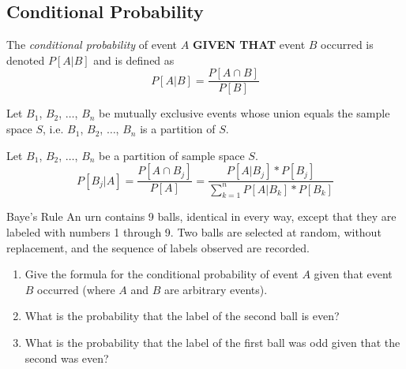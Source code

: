 	\subsection{Conditional Probability} \label{subsec:Conditional Probability}
		\begin{definition} \label{def:Conditional Probability}
			The \emph{conditional probability} of event $A$ \textbf{GIVEN THAT} event $B$ occurred is denoted $P \left[ A \vert B \right]$ and is defined as
			\begin{equation} \label{eq:Conditional Probability}
				P \left[ A \vert B \right] = \frac{P \left[ A \cap B \right]}{P \left[ B \right]}
			\end{equation}
		\end{definition}
		\begin{theorem} \label{thm:Theorem of Total Probability}
			Let $B_{1}$, $B_{2}$, $\ldots$, $B_{n}$ be mutually exclusive events whose union equals the sample space $S$, i.e. $B_{1}$, $B_{2}$, $\ldots$, $B_{n}$ is a partition of $S$.
		\end{theorem}
		\begin{definition} \label{def:Baye's Rule}
			Let $B_{1}$, $B_{2}$, $\ldots$, $B_{n}$ be a partition of sample space $S$.
			\begin{equation}
				P \left[ B_{j} \vert A \right] = \frac{P \left[ A \cap B_{j} \right]}{P \left[ A \right]}
				= \frac{P \left[ A \vert B_{j} \right] * P \left[ B_{j} \right]}{\sum\limits_{k=1}^{n} P \left[ A \vert B_{k} \right] * P \left[ B_{k} \right]}
			\end{equation}
		\end{definition}
		\begin{example}{Baye's Rule}
			An urn contains 9 balls, identical in every way, except that they are labeled with numbers 1 through 9.
			Two balls are selected at random, without replacement, and the sequence of labels observed are recorded.
			\begin{enumerate}[label=(\alph*), noitemsep, nolistsep]
				\item Give the formula for the conditional probability of event $A$ given that event $B$ occurred (where $A$ and $B$ are arbitrary events).
				\item What is the probability that the label of the second ball is even?
				\item What is the probability that the label of the first ball was odd given that the second was even?
			\end{enumerate}
		\end{example}
	
